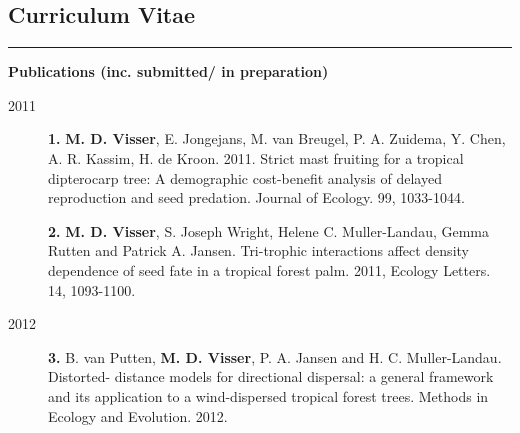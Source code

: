 \documentclass[b5paper,justified]{tufte-book} %
\begin{document}
\begin{fullwidth}
\chapter{Curriculum Vitae}

\begin{center}\rule{0.5\linewidth}{\linethickness}\end{center}

\Large \textbf{Publications (inc. submitted/ in
preparation)}
\vspace{1cm}
\footnotesize
\begin{description}

\item[2011]
\textbf{1.} \textbf{M. D. Visser}, E. Jongejans, M. van Breugel, P. A.
Zuidema, Y. Chen, A. R. Kassim, H. de Kroon. 2011. Strict mast fruiting
for a tropical dipterocarp tree: A demographic cost-benefit analysis of
delayed reproduction and seed predation. Journal of Ecology. 99,
1033-1044.

\textbf{2.} \textbf{M. D. Visser}, S. Joseph Wright, Helene C.
Muller-Landau, Gemma Rutten and Patrick A. Jansen. Tri-trophic
interactions affect density dependence of seed fate in a tropical forest
palm. 2011, Ecology Letters. 14, 1093-1100.
\item[2012]
\textbf{3.} B. van Putten, \textbf{M. D. Visser}, P. A. Jansen and H. C.
Muller-Landau. Distorted- distance models for directional dispersal: a
general framework and its application to a wind-dispersed tropical
forest trees. Methods in Ecology and Evolution. 2012.


\end{description}
\end{fullwidth}
\end{document}
